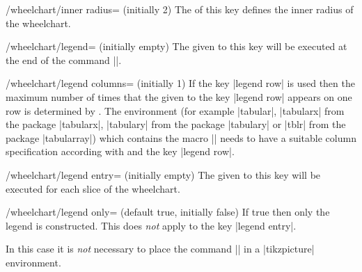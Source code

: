 \documentclass[a4paper,english,dvipsnames]{ltxdoc}
\begin{document}
\begin{key}{/wheelchart/inner radius= (initially 2)}
The  of this key defines the inner radius of the wheelchart.
\end{key}
\begin{key}{/wheelchart/legend= (initially \normalfont empty)}
The  given to this key will be executed at the end of the command |\wheelchart|.
\end{key}
\begin{key}{/wheelchart/legend columns= (initially 1)}
If the key |legend row| is used then the maximum number of times that the  given to the key |legend row| appears on one row is determined by . The environment (for example |tabular|, |tabularx| from the package |tabularx|, |tabulary| from the package |tabulary| or |tblr| from the package |tabularray|) which contains the macro |\WClegend| needs to have a suitable column specification according with  and the key |legend row|.
\end{key}
\begin{key}{/wheelchart/legend entry= (initially \normalfont empty)}
The  given to this key will be executed for each slice of the wheelchart.
\end{key}
\begin{key}{/wheelchart/legend only= (default true, initially false)}
If true then only the legend is constructed. This does \emph{not} apply to the key |legend entry|.

In this case it is \emph{not} necessary to place the command |\wheelchart| in a |tikzpicture| environment.
\begin{codeexample}[width=10cm,preamble={\usepackage{tikzlings}}]
\end{codeexample}
\end{key}
\end{document}
